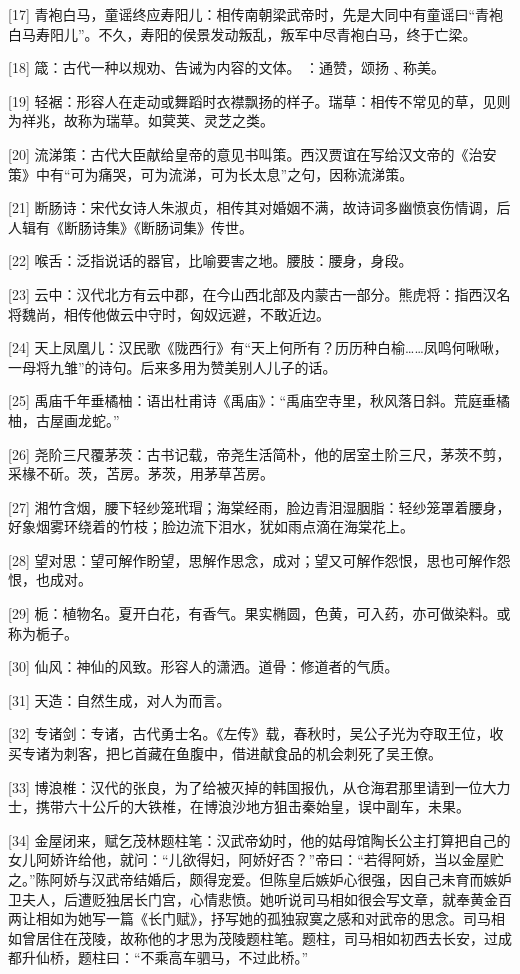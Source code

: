 \documentclass[12pt,UTF8]{ctexbook}
\begin{document}
[17] 青袍白马，童谣终应寿阳儿：相传南朝梁武帝时，先是大同中有童谣曰“青袍白马寿阳儿”。不久，寿阳的侯景发动叛乱，叛军中尽青袍白马，终于亡梁。

[18] 箴：古代一种以规劝、告诫为内容的文体。 ：通赞，颂扬﹑称美。

[19] 轻裾：形容人在走动或舞蹈时衣襟飘扬的样子。瑞草：相传不常见的草，见则为祥兆，故称为瑞草。如蓂荚、灵芝之类。

[20] 流涕策：古代大臣献给皇帝的意见书叫策。西汉贾谊在写给汉文帝的《治安策》中有“可为痛哭，可为流涕，可为长太息”之句，因称流涕策。

[21] 断肠诗：宋代女诗人朱淑贞，相传其对婚姻不满，故诗词多幽愤哀伤情调，后人辑有《断肠诗集》《断肠词集》传世。

[22] 喉舌：泛指说话的器官，比喻要害之地。腰肢：腰身，身段。

[23] 云中：汉代北方有云中郡，在今山西北部及内蒙古一部分。熊虎将：指西汉名将魏尚，相传他做云中守时，匈奴远避，不敢近边。

[24] 天上凤凰儿：汉民歌《陇西行》有“天上何所有？历历种白榆……凤鸣何啾啾，一母将九雏”的诗句。后来多用为赞美别人儿子的话。

[25] 禹庙千年垂橘柚：语出杜甫诗《禹庙》：“禹庙空寺里，秋风落日斜。荒庭垂橘柚，古屋画龙蛇。”

[26] 尧阶三尺覆茅茨：古书记载，帝尧生活简朴，他的居室土阶三尺，茅茨不剪，采椽不斫。茨，苫房。茅茨，用茅草苫房。

[27] 湘竹含烟，腰下轻纱笼玳瑁；海棠经雨，脸边青泪湿胭脂：轻纱笼罩着腰身，好象烟雾环绕着的竹枝；脸边流下泪水，犹如雨点滴在海棠花上。

[28] 望对思：望可解作盼望，思解作思念，成对；望又可解作怨恨，思也可解作怨恨，也成对。

[29] 栀：植物名。夏开白花，有香气。果实椭圆，色黄，可入药，亦可做染料。或称为栀子。

[30] 仙风：神仙的风致。形容人的潇洒。道骨：修道者的气质。

[31] 天造：自然生成，对人为而言。

[32] 专诸剑：专诸，古代勇士名。《左传》载，春秋时，吴公子光为夺取王位，收买专诸为刺客，把匕首藏在鱼腹中，借进献食品的机会刺死了吴王僚。

[33] 博浪椎：汉代的张良，为了给被灭掉的韩国报仇，从仓海君那里请到一位大力士，携带六十公斤的大铁椎，在博浪沙地方狙击秦始皇，误中副车，未果。

[34] 金屋闭来，赋乞茂林题柱笔：汉武帝幼时，他的姑母馆陶长公主打算把自己的女儿阿娇许给他，就问：“儿欲得妇，阿娇好否？”帝曰：“若得阿娇，当以金屋贮之。”陈阿娇与汉武帝结婚后，颇得宠爱。但陈皇后嫉妒心很强，因自己未育而嫉妒卫夫人，后遭贬独居长门宫，心情悲愤。她听说司马相如很会写文章，就奉黄金百两让相如为她写一篇《长门赋》，抒写她的孤独寂寞之感和对武帝的思念。司马相如曾居住在茂陵，故称他的才思为茂陵题柱笔。题柱，司马相如初西去长安，过成都升仙桥，题柱曰：“不乘高车驷马，不过此桥。”
\end{document}
